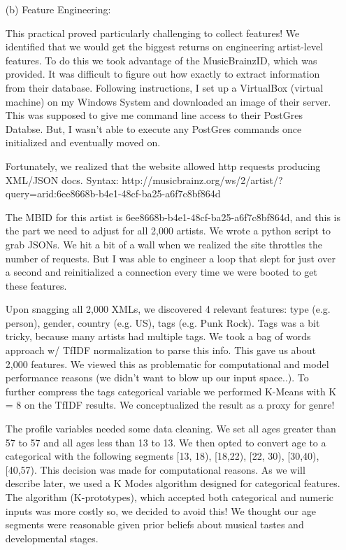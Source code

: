\documentclass[12pt]{article}
\newcommand\tab[1][0.5cm]{\hspace*{#1}}
\begin{document}
\begin{enumerate}
\item[(b)]
Feature Engineering:

\tab This practical proved particularly challenging to collect features!  We identified that we would get the biggest returns on engineering artist-level features. To do this we took advantage of the MusicBrainzID, which was provided. It was difficult to figure out how exactly to extract information from their database. Following instructions, I set up a VirtualBox (virtual machine) on my Windows System and downloaded an image of their server. This was supposed to give me command line access to their PostGres Databse.  But, I wasn't able to execute any PostGres commands once initialized and eventually moved on.

\tab Fortunately, we realized that the website allowed http requests producing XML/JSON docs. Syntax: http://musicbrainz.org/ws/2/artist/?query=arid:6ee8668b-b4e1-48cf-ba25-a6f7c8bf864d

\tab The MBID for this artist is 6ee8668b-b4e1-48cf-ba25-a6f7c8bf864d, and this is the part we need to adjust for all 2,000 artists.  We wrote a python script to grab JSONs. We hit a bit of a wall when we realized the site throttles the number of requests. But I was able to engineer a loop that slept for just over a second and reinitialized a connection every time we were booted to get these features.  

\tab Upon snagging all 2,000 XMLs, we discovered 4 relevant features: type (e.g. person), gender, country (e.g. US), tags (e.g. Punk Rock).  Tags was a bit tricky, because many artists had multiple tags.  We took a bag of words approach w/ TfIDF normalization to parse this info. This gave us about 2,000 features. We viewed this as problematic for computational and model performance reasons (we didn't want to blow up our input space..). To further compress the tags categorical variable we performed K-Means with K = 8 on the TfIDF results. We conceptualized the result as a proxy for genre!  

\tab The profile variables needed some data cleaning. We set all ages greater than 57 to 57 and all ages less than 13 to 13. We then opted to convert age to a categorical with the following segments [13, 18), [18,22), [22, 30), [30,40),[40,57).  This decision was made for computational reasons. As we will describe later, we used a K Modes algorithm designed for categorical features. The algorithm (K-prototypes), which accepted both categorical and numeric inputs was more costly so, we decided to avoid this! We thought our age segments were reasonable given prior beliefs about musical tastes and developmental stages.


\end{enumerate}
\end{document}
